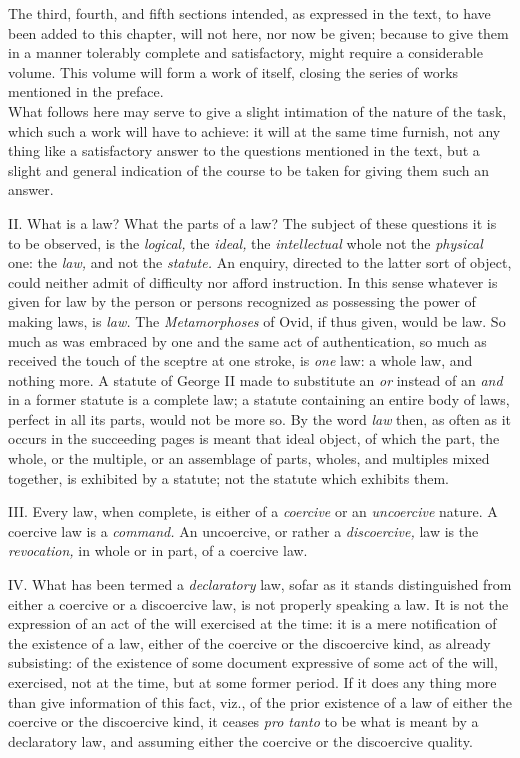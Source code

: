 \documentclass[12pt]{report}
\begin{document}
The third, fourth, and fifth sections intended, as expressed in the
text, to have been added to this chapter, will not here, nor now be
given; because to give them in a manner tolerably complete and
satisfactory, might require a considerable volume. This volume will form
a work of itself, closing the series of works mentioned in the
preface.\\
What follows here may serve to give a slight intimation of the nature of
the task, which such a work will have to achieve: it will at the same
time furnish, not any thing like a satisfactory answer to the questions
mentioned in the text, but a slight and general indication of the course
to be taken for giving them such an answer.

II. What is a law? What the parts of a law? The subject of these
questions it is to be observed, is the \emph{logical,} the \emph{ideal,}
the \emph{intellectual} whole not the \emph{physical} one: the
\emph{law,} and not the \emph{statute.} An enquiry, directed to the
latter sort of object, could neither admit of difficulty nor afford
instruction. In this sense whatever is given for law by the person or
persons recognized as possessing the power of making laws, is
\emph{law.} The \emph{Metamorphoses} of Ovid, if thus given, would be
law. So much as was embraced by one and the same act of authentication,
so much as received the touch of the sceptre at one stroke, is
\emph{one} law: a whole law, and nothing more. A statute of George II
made to substitute an \emph{or} instead of an \emph{and} in a former
statute is a complete law; a statute containing an entire body of laws,
perfect in all its parts, would not be more so. By the word \emph{law}
then, as often as it occurs in the succeeding pages is meant that ideal
object, of which the part, the whole, or the multiple, or an assemblage
of parts, wholes, and multiples mixed together, is exhibited by a
statute; not the statute which exhibits them.

III. Every law, when complete, is either of a \emph{coercive} or an
\emph{uncoercive} nature. A coercive law is a \emph{command.} An
uncoercive, or rather a \emph{discoercive,} law is the
\emph{revocation,} in whole or in part, of a coercive law.

IV. What has been termed a \emph{declaratory} law, sofar as it stands
distinguished from either a coercive or a discoercive law, is not
properly speaking a law. It is not the expression of an act of the will
exercised at the time: it is a mere notification of the existence of a
law, either of the coercive or the discoercive kind, as already
subsisting: of the existence of some document expressive of some act of
the will, exercised, not at the time, but at some former period. If it
does any thing more than give information of this fact, viz., of the
prior existence of a law of either the coercive or the discoercive kind,
it ceases \emph{pro tanto} to be what is meant by a declaratory law, and
assuming either the coercive or the discoercive quality.
\end{document}
